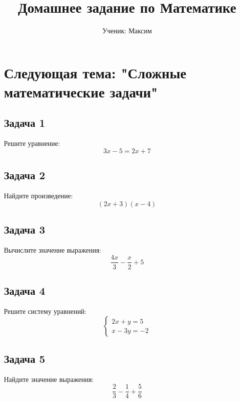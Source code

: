 \documentclass{article}
\begin{document}
\title{Домашнее задание по Математике}
\author{Ученик: Максим}
\date{}
\maketitle

\section*{Следующая тема: "Сложные математические задачи"}

\subsection*{Задача 1}
Решите уравнение:
\[
3x - 5 = 2x + 7
\]

\subsection*{Задача 2}
Найдите произведение:
\[
(2x + 3)(x - 4)
\]

\subsection*{Задача 3}
Вычислите значение выражения:
\[
\frac{4x}{3} - \frac{x}{2} + 5
\]

\subsection*{Задача 4}
Решите систему уравнений:
\[
\begin{cases}
2x + y = 5 \\
x - 3y = -2
\end{cases}
\]

\subsection*{Задача 5}
Найдите значение выражения:
\[
\frac{2}{3} - \frac{1}{4} + \frac{5}{6}
\]
\end{document}
